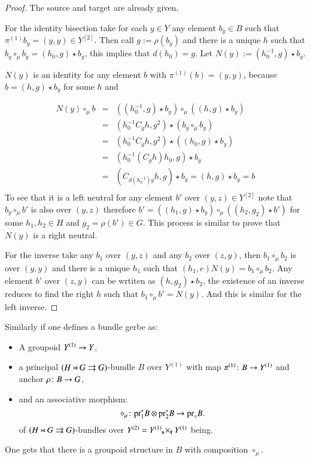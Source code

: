 \begin{proof}
	The source and target are already given.
	
	For the identity bisection take for each $y\in Y$ any element $b_y\in B$ such that $\pi^{(1)}b_y=(y,y)\in Y^{[2]}$. 
	Then call $g:= \rho(b_y)$ and there is a unique $h$ such that $b_y\circ_\mu b_y = (h_0,g)\star b_y$, this implies that $d(h_0)=g$. Let $N(y):=(h_0^{-1},g)\star b_y$.
	
	$N(y)$ is an identity for any element $b$ with $\pi^{(1)}(b)=(y,y)$, because $b=(h,g)\star b_y$ for some $h$ and 
	
	\begin{eqnarray*}
		N(y)\circ_\mu b &=&((h_0^{-1},g)\star b_y)\circ_\mu ((h,g)\star b_y)\\
		&=& (h_0^{-1}C_g h,g^2)\star (b_y\circ_\mu b_y)\\
		&=& (h_0^{-1}C_g h,g^2)\star ((h_0,g)\star b_y)\\
		&=& (h_0^{-1}(C_g h)h_0,g)\star b_y\\
		&=& (C_{d(h_0^{-1})g} h,g)\star b_y=(h,g)\star b_y= b\\
	\end{eqnarray*}
	To see that it is a left neutral for any element $b'$ over $(y,z)\in Y^{[2]}$ note that $b_y\circ_\mu b'$ is also over $(y,z)$ therefore $b'=((h_1,g)\star b_y)\circ_\mu ((h_2,g_2)\star b')$ for some $h_1,h_2\in H$ and $g_2=\rho(b')\in G$. This process is similar to prove that $N(y)$ is a right neutral.
	
	For the inverse take any $b_1$ over $(y,z)$ and any $b_2$ over $(z,y)$, then $b_1\circ_\mu b_2$ is over $(y,y)$ and there is a unique $h_1$ such that $(h_1,e)N(y)=b_1\circ_\mu b_2$. Any element $b'$ over $(z,y)$ can be wrtiten as $(h,g_2)\star b_2$, the existence of an inverse reduces to find the right $h$ such that  $b_1\circ_\mu b'= N(y)$. And this is similar for the left inverse.
\end{proof}

Similarly if one defines a bundle gerbe as:

\begin{itemize}
	\item A groupoid $ Y^{(1)}\rightarrow Y$,
	\item a principal $(H\rtimes G\rightrightarrows G)$-bundle $B$ over $Y^{(1)}$ with map $\pi^{(1)}\colon B\rightarrow Y^{(1)}$ and anchor $\rho\colon B\rightarrow G$,
	\item and an associative morphism:
	$$\circ_\mu \colon {\rm pr}_1^* B\otimes {\rm pr}_2^* B\rightarrow {\rm pr}_\circ B.$$
	of $(H\rtimes G\rightrightarrows G)$-bundles over $Y^{(2)}=Y^{(1)} {}_{\mathbf{s}} \! \times_{\mathbf{t}} Y^{(1)}$ being.	
\end{itemize} 
One gets that there is a groupoid structure in $B$ with composition $\circ_\mu$.